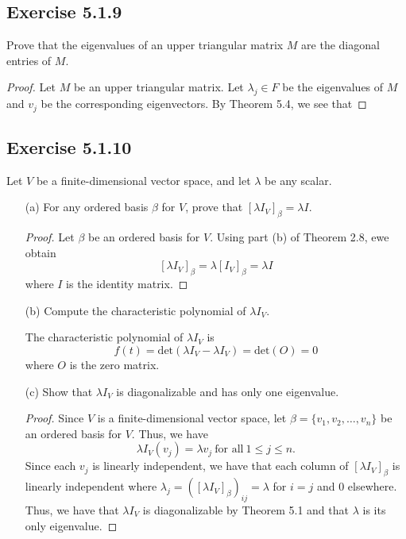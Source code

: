\subsection*{Exercise 5.1.9} Prove that the eigenvalues of an upper triangular matrix \( M  \) are the diagonal entries of \( M  \).
\begin{proof}
Let \( M  \) be an upper triangular matrix. Let \( \lambda_j \in F   \) be the eigenvalues of \( M  \) and \( {v}_{j}  \) be the corresponding eigenvectors. By Theorem 5.4, we see that    
\end{proof}

\subsection*{Exercise 5.1.10} Let \( V  \) be a finite-dimensional vector space, and let \( \lambda  \) be any scalar.
\begin{enumerate}
    \item[(a)] For any ordered basis \( \beta \) for \( V  \), prove that \( [\lambda {I}_{V}]_{\beta} = \lambda I  \).
        \begin{proof}
        Let \( \beta \) be an ordered basis for \( V  \). Using part (b) of Theorem 2.8, ewe obtain
        \[  [\lambda {I}_{V}]_{\beta} = \lambda [{I}_{V}]_{\beta} = \lambda I  \]
        where \( I  \) is the identity matrix. 
        \end{proof}
    \item[(b)] Compute the characteristic polynomial of \( \lambda {I}_{V} \). 
        \begin{solution}
        The characteristic polynomial of \( \lambda {I}_{V} \) is 
        \[ f(t) = \text{det}( \lambda {I}_{V} - \lambda {I}_{V}) = \text{det}(O) = 0  \]
        where \( O  \) is the zero matrix.
        \end{solution}
    \item[(c)] Show that \( {\lambda I }_{V} \) is diagonalizable and has only one eigenvalue.
        \begin{proof}
        Since \( V  \) is a finite-dimensional vector space, let \( \beta = \{ {v}_{1}, {v}_{2}, \dots, {v}_{n} \}   \) be an ordered basis for \( V  \). Thus, we have 
        \[ \lambda {I}_{V}({v}_{j}) = \lambda {v}_{j} \ \text{for all} \ 1 \leq j \leq n.    \]
        Since each \( {v}_{j} \) is linearly independent, we have that each column of \( [\lambda {I}_{V}]_{\beta} \) is linearly independent where \( {\lambda}_{j} = ([\lambda {I}_{V}]_{\beta})_{ij} = \lambda \) for \( i = j  \) and \( 0  \) elsewhere. Thus, we have that \( \lambda {I}_{V} \) is diagonalizable by Theorem 5.1 and that \( \lambda  \) is its only eigenvalue.
        \end{proof}
\end{enumerate}


